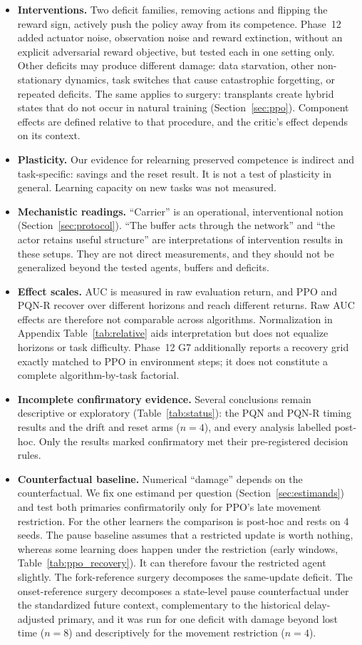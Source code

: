 \documentclass[10pt]{article} %
\begin{document}
\begin{itemize}
\item \textbf{Interventions.} Two deficit families, removing actions and flipping the reward sign, actively push the policy away from its competence. Phase~12 added actuator noise, observation noise and reward extinction, without an explicit adversarial reward objective, but tested each in one setting only. Other deficits may produce different damage: data starvation, other non-stationary dynamics, task switches that cause catastrophic forgetting, or repeated deficits. The same applies to surgery: transplants create hybrid states that do not occur in natural training (Section~\ref{sec:ppo}). Component effects are defined relative to that procedure, and the critic's effect depends on its context.
\item \textbf{Plasticity.} Our evidence for relearning preserved competence is indirect and task-specific: savings and the reset result. It is not a test of plasticity in general. Learning capacity on new tasks was not measured.
\item \textbf{Mechanistic readings.} ``Carrier'' is an operational, interventional notion (Section~\ref{sec:protocol}). ``The buffer acts through the network'' and ``the actor retains useful structure'' are interpretations of intervention results in these setups. They are not direct measurements, and they should not be generalized beyond the tested agents, buffers and deficits.
\item \textbf{Effect scales.} AUC is measured in raw evaluation return, and PPO and PQN-R recover over different horizons and reach different returns. Raw AUC effects are therefore not comparable across algorithms. Normalization in Appendix Table~\ref{tab:relative} aids interpretation but does not equalize horizons or task difficulty. Phase~12 G7 additionally reports a recovery grid exactly matched to PPO in environment steps; it does not constitute a complete algorithm-by-task factorial.
\item \textbf{Incomplete confirmatory evidence.} Several conclusions remain descriptive or exploratory (Table~\ref{tab:status}): the PQN and PQN-R timing results and the drift and reset arms ($n=4$), and every analysis labelled post-hoc. Only the results marked confirmatory met their pre-registered decision rules.
\item \textbf{Counterfactual baseline.} Numerical ``damage'' depends on the counterfactual. We fix one estimand per question (Section~\ref{sec:estimands}) and test both primaries confirmatorily only for PPO's late movement restriction. For the other learners the comparison is post-hoc and rests on 4 seeds. The pause baseline assumes that a restricted update is worth nothing, whereas some learning does happen under the restriction (early windows, Table~\ref{tab:ppo_recovery}). It can therefore favour the restricted agent slightly. The fork-reference surgery decomposes the same-update deficit. The onset-reference surgery decomposes a state-level pause counterfactual under the standardized future context, complementary to the historical delay-adjusted primary, and it was run for one deficit with damage beyond lost time ($n=8$) and descriptively for the movement restriction ($n=4$).

\end{itemize}
\end{document}
